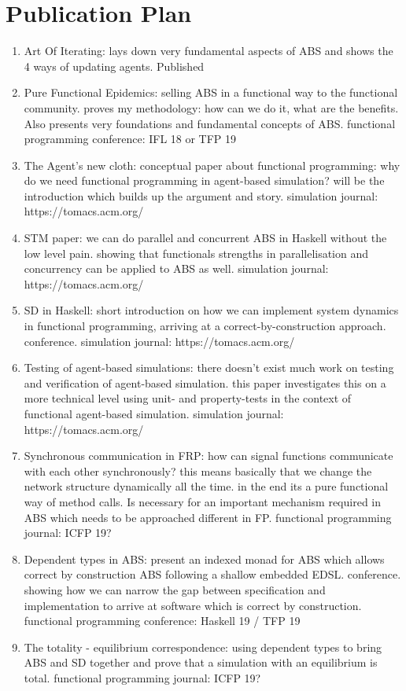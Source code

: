 \section{Publication Plan}
\begin{enumerate}
	\item Art Of Iterating: lays down very fundamental aspects of ABS and shows the 4 ways of updating agents. Published
	
	\item Pure Functional Epidemics: selling ABS in a functional way to the functional community. proves my methodology: how can we do it, what are the benefits. Also presents very foundations and fundamental concepts of ABS. functional programming conference: IFL 18 or TFP 19

	\item The Agent's new cloth: conceptual paper about functional programming: why do we need functional programming in agent-based simulation? will be the introduction which builds up the argument and story. simulation journal: https://tomacs.acm.org/
	
	\item STM paper: we can do parallel and concurrent ABS in Haskell without the low level pain. showing that functionals strengths in parallelisation and concurrency can be applied to ABS as well. simulation journal: https://tomacs.acm.org/
	
	\item SD in Haskell: short introduction on how we can implement system dynamics in functional programming, arriving at a correct-by-construction approach. conference. simulation journal: https://tomacs.acm.org/
	
	\item Testing of agent-based simulations: there doesn't exist much work on testing and verification of agent-based simulation. this paper investigates this on a more technical level using unit- and property-tests in the context of functional agent-based simulation. simulation journal: https://tomacs.acm.org/

	\item Synchronous communication in FRP: how can signal functions communicate with each other synchronously? this means basically that we change the network structure dynamically all the time. in the end its a pure functional way of method calls. Is necessary for an important mechanism required in ABS which needs to be approached different in FP. functional programming journal: ICFP 19?
	
	\item Dependent types in ABS: present an indexed monad for ABS which allows correct by construction ABS following a shallow embedded EDSL. conference. showing how we can narrow the gap between specification and implementation to arrive at software which is correct by construction. functional programming conference: Haskell 19 / TFP 19

	\item The totality - equilibrium correspondence: using dependent types to bring ABS and SD together and prove that a simulation with an equilibrium is total. functional programming journal: ICFP 19?
\end{enumerate}

